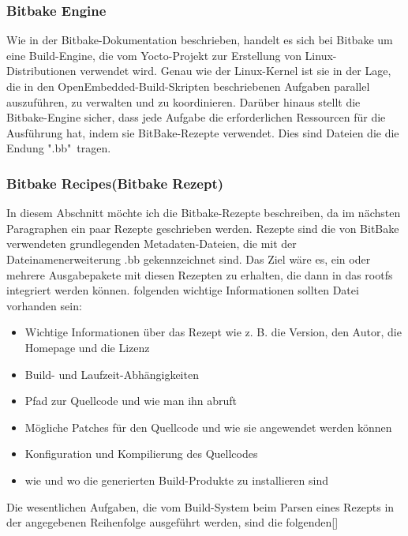 \subsubsection{Bitbake Engine}

Wie in der Bitbake-Dokumentation beschrieben, handelt es sich bei Bitbake um eine Build-Engine, die vom Yocto-Projekt zur Erstellung von Linux-Distributionen verwendet wird. Genau wie der Linux-Kernel ist sie in der Lage, die in den OpenEmbedded-Build-Skripten beschriebenen Aufgaben parallel auszuführen, zu verwalten und zu koordinieren. Darüber hinaus stellt die Bitbake-Engine sicher, dass jede Aufgabe die erforderlichen Ressourcen für die Ausführung hat, indem sie BitBake-Rezepte verwendet. Dies sind Dateien die die Endung ".bb"\ tragen.

\subsubsection{Bitbake Recipes(Bitbake Rezept)}
In diesem Abschnitt möchte ich die Bitbake-Rezepte beschreiben, da im nächsten Paragraphen ein paar Rezepte geschrieben werden. 
Rezepte sind die von BitBake verwendeten grundlegenden Metadaten-Dateien, die mit der Dateinamenerweiterung .bb gekennzeichnet sind. Das Ziel wäre es, ein oder mehrere Ausgabepakete mit diesen Rezepten zu erhalten, die dann in das rootfs integriert werden können. folgenden wichtige Informationen sollten Datei vorhanden sein: 
\begin{itemize}
	\item Wichtige Informationen über das Rezept wie z. B. die Version, den Autor, die Homepage und die Lizenz
	\item Build- und Laufzeit-Abhängigkeiten
	\item Pfad zur Quellcode und wie man ihn abruft
	\item Mögliche Patches für den Quellcode und wie sie angewendet werden können
	\item Konfiguration und Kompilierung des Quellcodes
	\item wie und wo die generierten Build-Produkte zu installieren sind
\end{itemize}
Die wesentlichen Aufgaben, die vom Build-System beim Parsen eines Rezepts in der angegebenen Reihenfolge ausgeführt werden, sind die folgenden[\cite{YoctoProj}]

